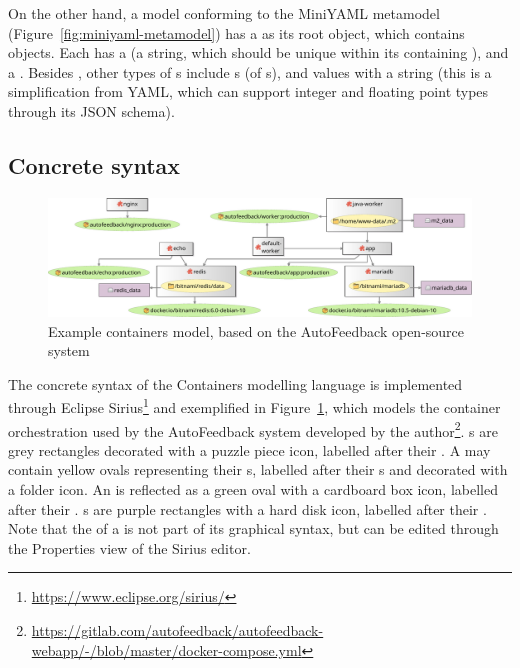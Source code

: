 \documentclass[twocolumn]{ceurart}
\begin{document}
On the other hand, a model conforming to the MiniYAML metamodel
(Figure~\ref{fig:miniyaml-metamodel}) has a  as its root object,
which contains  objects. Each  has a
 (a string, which should be unique within its containing
), and a . Besides , other types of
s include s (of s), and
 values with a string (this is a simplification from YAML,
which can support integer and floating point types through its JSON schema).

\subsection{Concrete syntax}
\label{sec:concrete-syntax}

\newcommand*{\eclipseproject}[1]{\texttt{#1}}
\newcommand*{\javaclass}[1]{\textsc{#1}}

\begin{figure}
  \centering
  \includegraphics[width=\textwidth]{containers-model}
  \caption{Example containers model, based on the AutoFeedback open-source system}%
  \label{fig:containers-model}
\end{figure}

The concrete syntax of the Containers modelling language is implemented through
Eclipse Sirius\footnote{\url{https://www.eclipse.org/sirius/}} and exemplified
in Figure~\ref{fig:containers-model}, which models the container orchestration
used by the AutoFeedback system developed by the
author\footnote{\url{https://gitlab.com/autofeedback/autofeedback-webapp/-/blob/master/docker-compose.yml}}.
s are grey rectangles decorated with a puzzle piece icon,
labelled after their . A  may contain yellow
ovals representing their s, labelled after their
s and decorated with a folder icon. An  is
reflected as a green oval with a cardboard box icon, labelled after their
. s are purple rectangles with a hard disk
icon, labelled after their . Note that the  of a
 is not part of its graphical syntax, but can be edited
through the Properties view of the Sirius editor.
\end{document}
